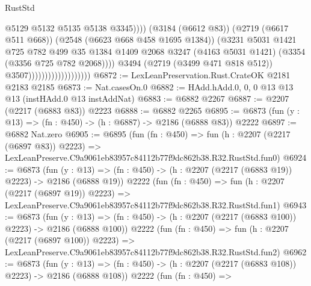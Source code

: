 \begin{lexlean}{RustStd}
\begin{coremodule}
                                                    @5129
                                                    @5132
                                                    @5135
                                                    @5138
                                                    @3345))))
                                            (@3184 (@6612 @83))
                                            (@2719 (@6617 @511 @668))
                                            (@2548 (@6623 @668 @458 @1695 @1384))
                                            (@3231
                                              @5031
                                              @1421
                                              @725
                                              @782
                                              @499
                                              @35
                                              @1384
                                              @1409
                                              @2068
                                              @3247
                                              (@4163 @5031 @1421)
                                              (@3354 (@3356 @725 @782 @2068))))
                                          @3494
                                          (@2719 (@3499 @471 @818 @512))
                                          @3507)))))))))))))))))))
@6872 := LexLeanPreservation.Rust.CrateOK @2181 @2183 @2185
@6873 := Nat.casesOn.{0}
@6882 := HAdd.hAdd.{0, 0, 0} @13 @13 @13 (instHAdd.{0} @13 instAddNat)
@6883 := @6882 @2267
@6887 := @2207 (@2217 (@6883 @83)) @2223
@6888 := @6882 @2265
@6895 := @6873 (fun (y : @13) => (fn : @450) -> (h : @6887) -> @2186 (@6888 @83)) @2222
@6897 := @6882 Nat.zero
@6905 := @6895
    (fun (fn : @450) =>
    fun (h : @2207 (@2217 (@6897 @83)) @2223) =>
    LexLeanPreserve.C9a9061eb83957c84112b77f9dc862b38.R32.RustStd.fun0)
@6924 := @6873
    (fun (y : @13) => (fn : @450) -> (h : @2207 (@2217 (@6883 @19)) @2223) -> @2186 (@6888 @19))
    @2222
    (fun (fn : @450) =>
    fun (h : @2207 (@2217 (@6897 @19)) @2223) =>
    LexLeanPreserve.C9a9061eb83957c84112b77f9dc862b38.R32.RustStd.fun1)
@6943 := @6873
    (fun (y : @13) => (fn : @450) -> (h : @2207 (@2217 (@6883 @100)) @2223) -> @2186 (@6888 @100))
    @2222
    (fun (fn : @450) =>
    fun (h : @2207 (@2217 (@6897 @100)) @2223) =>
    LexLeanPreserve.C9a9061eb83957c84112b77f9dc862b38.R32.RustStd.fun2)
@6962 := @6873
    (fun (y : @13) => (fn : @450) -> (h : @2207 (@2217 (@6883 @108)) @2223) -> @2186 (@6888 @108))
    @2222
    (fun (fn : @450) =>

\end{coremodule}
\end{lexlean}
